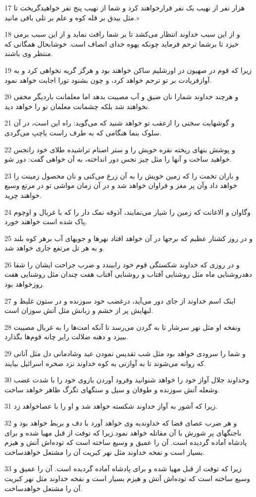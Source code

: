 \par 17 هزار نفر از نهیب یک نفر فرارخواهند کرد و شما از نهیب پنج نفر خواهیدگریخت تا مثل بیدق بر قله کوه و علم بر تلی باقی مانید.»
\par 18 و از این سبب خداوند انتظار می‌کشد تا بر شما رافت نماید و از این سبب برمی خیزد تا برشما ترحم فرماید چونکه یهوه خدای انصاف است. خوشابحال همگانی که منتظر وی باشند.
\par 19 زیرا که قوم در صهیون در اورشلیم ساکن خواهند بود و هرگز گریه نخواهی کرد و به آوازفریادت بر تو ترحم خواهد کرد، و چون بشنود تورا اجابت خواهد نمود.
\par 20 و هرچند خداوند شمارا نان ضیق و آب مصیبت بدهد اما معلمانت باردیگر مخفی نخواهند شد بلکه چشمانت معلمان تو را خواهد دید.
\par 21 و گوشهایت سخنی را ازعقب تو خواهد شنید که می‌گوید: راه این است، در آن سلوک بنما هنگامی که به طرف راست یاچپ می‌گردی.
\par 22 و پوشش بتهای ریخته نقره خویش را و ستر اصنام تراشیده طلای خود رانجس خواهید ساخت و آنها را مثل چیز نجس دور انداخته، به آن خواهی گفت: دور شو.
\par 23 و باران تخمت را که زمین خویش را به آن زرع می‌کنی و نان محصول زمینت را خواهد داد وآن پر مغز و فراوان خواهد شد و در آن زمان مواشی تو در مرتع وسیع خواهند چرید.
\par 24 وگاوان و الاغانت که زمین را شیار می‌نمایند، آذوقه نمک دار را که با غربال و اوچوم پاک شده است خواهند خورد.
\par 25 و در روز کشتار عظیم که برجها در آن خواهد افتاد نهرها و جویهای آب برهر کوه بلند و به هر تل مرتفع جاری خواهد شد.
\par 26 و در روزی که خداوند شکستگی قوم خود راببندد و ضرب جراحت ایشان را شفا دهدروشنایی ماه مثل روشنایی آفتاب و روشنایی آفتاب هفت چندان مثل روشنایی هفت روزخواهد بود.
\par 27 اینک اسم خداوند از جای دور می‌آید، درغضب خود سوزنده و در ستون غلیظ و لبهایش پر از خشم و زبانش مثل آتش سوزان است.
\par 28 ونفخه او مثل نهر سرشار تا به گردن می‌رسد تا آنکه امت‌ها را به غربال مصیبت ببیزد و دهنه ضلالت رابر چانه قوم‌ها بگذارد.
\par 29 و شما را سرودی خواهد بود مثل شب تقدیس نمودن عید وشادمانی دل مثل آنانی که روانه می‌شوند تا به آوازنی به کوه خداوند نزد صخره اسرائیل بیایند.
\par 30 وخداوند جلال آواز خود را خواهد شنوانید وفرود آوردن بازوی خود را با شدت غضب وشعله آتش سوزنده و طوفان و سیل و سنگهای تگرگ ظاهر خواهد ساخت.
\par 31 زیرا که آشور به آواز خداوند شکسته خواهد شد و او را با عصاخواهد زد.
\par 32 و هر ضرب عصای قضا که خداوندبه وی خواهد آورد با دف و بربط خواهد بود و باجنگهای پر شورش با آن مقاتله خواهد نمود.زیرا که توفت از قبل مهیا شده و برای پادشاه آماده گردیده است. آن را عمیق و وسیع ساخته است که توده‌اش آتش و هیزم بسیار است و نفخه خداوند مثل نهر کبریت آن را مشتعل خواهدساخت.
\par 33 زیرا که توفت از قبل مهیا شده و برای پادشاه آماده گردیده است. آن را عمیق و وسیع ساخته است که توده‌اش آتش و هیزم بسیار است و نفخه خداوند مثل نهر کبریت آن را مشتعل خواهدساخت.
 
